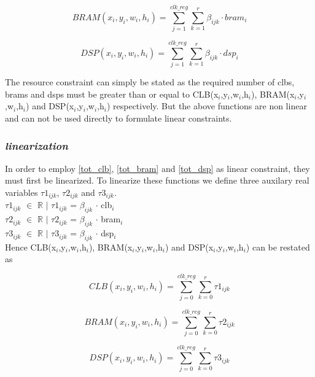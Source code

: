 \begin{equation}
BRAM(x_i,y_i,w_i,h_i) = \sum_{j=1}^{clk\_reg} \sum_{k=1}^{r} \beta_{ijk} \cdot bram_i 
\label{tot_bram}
\end{equation}


\begin{equation}
DSP(x_i,y_i,w_i,h_i) = \sum_{j=1}^{clk\_reg} \sum_{k=1}^{r} \beta_{ijk} \cdot dsp_i 
\label{tot_dsp}
\end{equation}

The resource constraint can simply be stated as the required number of clbs, brams and dsps must be greater than or equal to CLB(x$_i$,y$_i$,w$_i$,h$_i$), BRAM(x$_i$,y$_i$,w$_i$,h$_i$) and DSP(x$_i$,y$_i$,w$_i$,h$_i$) respectively. But the above functions are non linear and can not be used directly to formulate linear constraints.\\

\subsubsection*{\textit {linearization}}
In order to employ \ref{tot_clb}, \ref{tot_bram} and \ref{tot_dsp} as linear constraint, they must first be linearized. To linearize these functions we define three auxilary real variables $\tau1_{ijk}$, $\tau2_{ijk}$ and $\tau3_{ijk}$. \\

$\tau1_{ijk}$ $\in$ $\mathbb{R}$ $\mid$ $\tau1_{ijk}$ = $\beta_{ijk}$ $\cdot$ clb$_i$ \\

$\tau2_{ijk}$ $\in$ $\mathbb{R}$ $\mid$ $\tau2_{ijk}$ = $\beta_{ijk}$ $\cdot$ bram$_i$ \\

$\tau3_{ijk}$ $\in$ $\mathbb{R}$ $\mid$ $\tau3_{ijk}$ = $\beta_{ijk}$ $\cdot$ dsp$_i$ \\

Hence CLB(x$_i$,y$_i$,w$_i$,h$_i$), BRAM(x$_i$,y$_i$,w$_i$,h$_i$) and DSP(x$_i$,y$_i$,w$_i$,h$_i$) can be restated as 

\begin{equation}
CLB(x_i,y_i,w_i,h_i) = \sum_{j=0}^{clk\_reg} \sum_{k=0}^{r} \tau1_{ijk}
\end{equation}


\begin{equation}
BRAM(x_i,y_i,w_i,h_i) = \sum_{j=0}^{clk\_reg} \sum_{k=0}^{r} \tau2_{ijk}
\end{equation}

\begin{equation}
DSP(x_i,y_i,w_i,h_i) = \sum_{j=0}^{clk\_reg} \sum_{k=0}^{r} \tau3_{ijk}
\end{equation}

